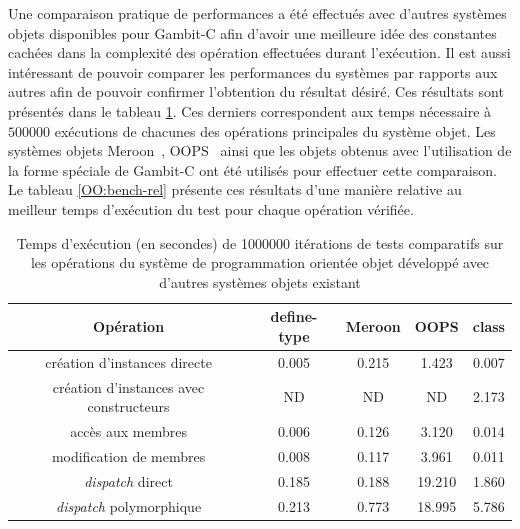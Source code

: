 \documentclass[12pt,twoside,letterpaper,francais]{book}
\newcommand{\scheme}[1]{\selectlanguage{english}{\tt #1}\selectlanguage{french}}
\begin{document}
Une comparaison pratique de performances a été effectués avec d'autres
systèmes objets disponibles pour Gambit-C afin d'avoir une meilleure
idée des constantes cachées dans la complexité des opération
effectuées durant l'exécution. Il est aussi intéressant de pouvoir
comparer les performances du systèmes par rapports aux autres afin de
pouvoir confirmer l'obtention du résultat désiré. Ces résultats sont
présentés dans le tableau \ref{OO:bench}. Ces derniers correspondent
aux temps nécessaire à $500 000$ exécutions de chacunes des opérations
principales du système objet. Les systèmes objets
Meroon~\cite{MEROON}, OOPS~\cite{OOPS} ainsi que les objets obtenus
avec l'utilisation de la forme spéciale \scheme{define-type} de
Gambit-C ont été utilisés pour effectuer cette comparaison. Le tableau
\ref{OO:bench-rel} présente ces résultats d'une manière relative au
meilleur temps d'exécution du test pour chaque opération vérifiée.

\begin{table}
  \center
  \begin{tabular}{ccccc}
    \hline
    Opération & define-type & Meroon & OOPS & class \\
    \hline \hline
    création d'instances directe            & 0.005 & 0.215 & 1.423 & 0.007\\
    création d'instances avec constructeurs & ND    & ND    & ND    & 2.173\\
    accès aux membres                       & 0.006 & 0.126 & 3.120 & 0.014\\
    modification de membres                 & 0.008 & 0.117 & 3.961 & 0.011\\
    \textit{dispatch} direct                & 0.185 & 0.188 & 19.210 & 1.860\\
    \textit{dispatch} polymorphique         & 0.213 & 0.773 & 18.995 & 5.786\\
    \hline
  \end{tabular}
  \caption{Temps d'exécution (en secondes) de 1000000 itérations de
    tests comparatifs sur les opérations du système de programmation
    orientée objet développé avec d'autres systèmes objets existant}
  \label{OO:bench}
\end{table}
\end{document}
